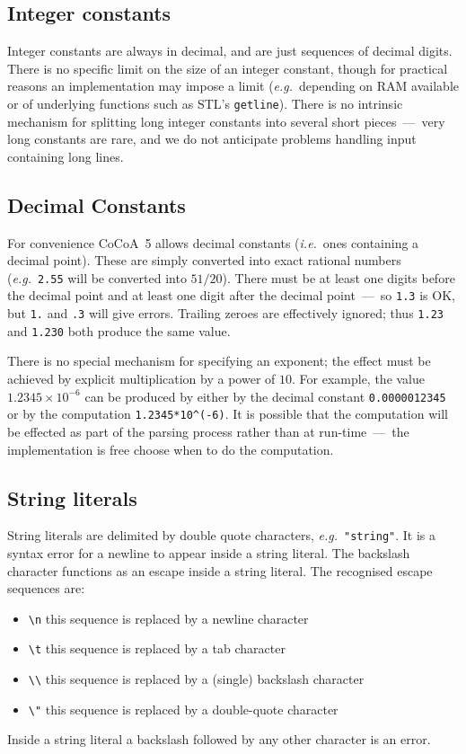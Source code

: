 \documentclass{book}[12,a4paper]
\def\ie{{\it i.e.}}
\def\eg{{\it e.g.}}
\begin{document}
\subsection{Integer constants}

Integer constants are always in decimal, and are just sequences of decimal
digits.  There is no specific limit on the size of an integer constant,
though for practical reasons an implementation may impose a limit
(\eg~depending on RAM available or  of underlying functions
such as STL's \texttt{getline}).  There is no intrinsic mechanism for
splitting long integer constants into several short pieces~---~very long
constants are rare, and we do not anticipate problems handling input
containing long lines.


\subsection{Decimal Constants}

For convenience CoCoA~5 allows decimal constants (\ie~ones containing a
decimal point).  These are simply converted into exact
rational numbers (\eg~\texttt{2.55} will be converted into $51/20$).  There
must be at least one digits before the decimal point and at least one digit
after the decimal point~---~so \texttt{1.3} is OK, but \texttt{1.} and
\texttt{.3} will give errors.  Trailing zeroes are effectively ignored; thus
\texttt{1.23} and \texttt{1.230} both produce the same value.

There is no special mechanism for specifying an exponent; the effect must
be achieved by explicit multiplication by a power of $10$.  For example,
the value $1.2345\times10^{-6}$ can be produced by either by the decimal
constant \texttt{0.0000012345} or by the computation \verb|1.2345*10^(-6)|.
It is possible that the computation will be effected as part of the parsing
process rather than at run-time~---~the implementation is free choose when
to do the computation.

\subsection{String literals}

String literals are delimited by double quote characters,
\eg~\verb|"string"|.  It is a syntax error for a newline to appear inside a
string literal.  The backslash character functions as an escape inside a
string literal.  The recognised escape sequences are:
\begin{itemize}
\setlength{\itemsep}{-3pt}
\item \verb|\n| this sequence is replaced by a newline character
\item \verb|\t| this sequence is replaced by a tab character
\item \verb|\\| this sequence is replaced by a (single) backslash character
\item \verb|\"| this sequence is replaced by a double-quote character
\end{itemize}
Inside a string literal a backslash followed by any other character is an error.
\end{document}
